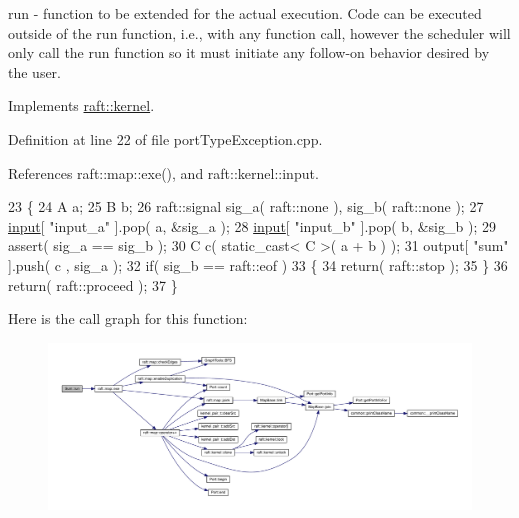 run -\/ function to be extended for the actual execution. Code can be executed outside of the run function, i.\+e., with any function call, however the scheduler will only call the run function so it must initiate any follow-\/on behavior desired by the user. 

Implements \hyperlink{classraft_1_1kernel_a05094286d7577360fb1b91c91fc05901}{raft\+::kernel}.



Definition at line 22 of file port\+Type\+Exception.\+cpp.



References raft\+::map\+::exe(), and raft\+::kernel\+::input.


\begin{DoxyCode}
23    \{
24       A a;
25       B b;
26       raft::signal  sig\_a( raft::none  ), sig\_b( raft::none );
27       \hyperlink{classraft_1_1kernel_a6edbe35a56409d402e719b3ac36d6554}{input}[ \textcolor{stringliteral}{"input\_a"} ].pop( a, &sig\_a );
28       \hyperlink{classraft_1_1kernel_a6edbe35a56409d402e719b3ac36d6554}{input}[ \textcolor{stringliteral}{"input\_b"} ].pop( b, &sig\_b );
29       assert( sig\_a == sig\_b );
30       C c( static\_cast< C >( a + b ) );
31       output[ \textcolor{stringliteral}{"sum"} ].push( c , sig\_a );
32       \textcolor{keywordflow}{if}( sig\_b == raft::eof )
33       \{
34          \textcolor{keywordflow}{return}( raft::stop );
35       \}
36       \textcolor{keywordflow}{return}( raft::proceed );
37    \}
\end{DoxyCode}
Here is the call graph for this function\+:
\nopagebreak
\begin{figure}[H]
\begin{center}
\leavevmode
\includegraphics[width=350pt]{class_sum_ab915892675d11a8f3f0de2e7f96b0d28_cgraph}
\end{center}
\end{figure}
\hypertarget{class_sum_ab915892675d11a8f3f0de2e7f96b0d28}{}\label{class_sum_ab915892675d11a8f3f0de2e7f96b0d28} 
